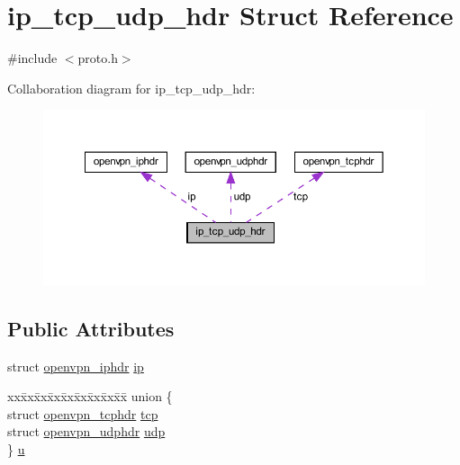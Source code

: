 \hypertarget{structip__tcp__udp__hdr}{}\section{ip\+\_\+tcp\+\_\+udp\+\_\+hdr Struct Reference}
\label{structip__tcp__udp__hdr}


{\ttfamily \#include $<$proto.\+h$>$}



Collaboration diagram for ip\+\_\+tcp\+\_\+udp\+\_\+hdr\+:
\nopagebreak
\begin{figure}[H]
\begin{center}
\leavevmode
\includegraphics[width=350pt]{structip__tcp__udp__hdr__coll__graph}
\end{center}
\end{figure}
\subsection*{Public Attributes}
\begin{DoxyCompactItemize}
\item 
struct \hyperlink{structopenvpn__iphdr}{openvpn\+\_\+iphdr} \hyperlink{structip__tcp__udp__hdr_a4e7c25d929a724fcb3b84d8909bf0e78}{ip}
\item 
\begin{tabbing}
xx\=xx\=xx\=xx\=xx\=xx\=xx\=xx\=xx\=\kill
union \{\\
\>struct \hyperlink{structopenvpn__tcphdr}{openvpn\_tcphdr} \hyperlink{structip__tcp__udp__hdr_aa0c123d19fa2f22a555941b8e6b374b5}{tcp}\\
\>struct \hyperlink{structopenvpn__udphdr}{openvpn\_udphdr} \hyperlink{structip__tcp__udp__hdr_a77de3ae52d193d9083fdd809e25a82b8}{udp}\\
\} \hyperlink{structip__tcp__udp__hdr_ab86163da5e98b649e1a36ca8fff24efe}{u}\\

\end{tabbing}\end{DoxyCompactItemize}



